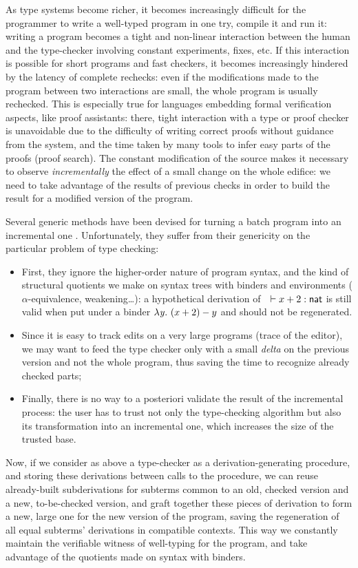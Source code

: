 \documentclass{llncs}
\begin{document}
As type systems become richer, it becomes increasingly difficult for
the programmer to write a well-typed program in one try, compile it
and run it: writing a program becomes a tight and non-linear
interaction between the human and the type-checker involving constant
experiments, fixes, etc. If this interaction is possible for short
programs and fast checkers, it becomes increasingly hindered by the
latency of complete rechecks: even if the modifications made to the
program between two interactions are small, the whole program is
usually rechecked. This is especially true for languages embedding
formal verification aspects, like proof assistants: there, tight
interaction with a type or proof checker is unavoidable due to the
difficulty of writing correct proofs without guidance from the system,
and the time taken by many tools to infer easy parts of the proofs
(proof search). The constant modification of the source makes it
necessary to observe \emph{incrementally} the effect of a small change
on the whole edifice: we need to take advantage of the results of
previous checks in order to build the result for a modified version of
the program.

Several generic methods have been devised for turning a batch program
into an incremental one
\cite{pugh1989incremental,acar2006,carlsson2002}. Unfortunately, they
suffer from their genericity on the particular problem of type
checking:
\begin{itemize}
\item First, they ignore the higher-order nature of program syntax,
  and the kind of structural quotients we make on syntax trees with
  binders and environments ($\alpha$-equivalence, weakening\ldots): a
  hypothetical derivation of\ \ $\vdash x+2 : \text{\textsf{nat}}$ is still
  valid when put under a binder $\lambda{\ensuremath{\text{\textit{y}}}}.\  (x + 2) - y$ and should not be
  regenerated.
\item Since it is easy to track edits on a very large programs (trace
  of the editor), we may want to feed the type checker only with a
  small \emph{delta} on the previous version and not the whole
  program, thus saving the time to recognize already checked parts;
\item Finally, there is no way to a posteriori validate the result of
  the incremental process: the user has to trust not only the
  type-checking algorithm but also its transformation into an
  incremental one, which increases the size of the trusted base.
\end{itemize}

Now, if we consider as above a type-checker as a derivation-generating
procedure, and storing these derivations between calls to the
procedure, we can reuse already-built subderivations for
subterms common to an old, checked version and a new, to-be-checked
version, and graft together these pieces of derivation to form a new,
large one for the new version of the program, saving the regeneration
of all equal subterms' derivations in compatible contexts. This way we
constantly maintain the verifiable witness of well-typing for the
program, and take advantage of the quotients made on syntax with
binders.
\end{document}
